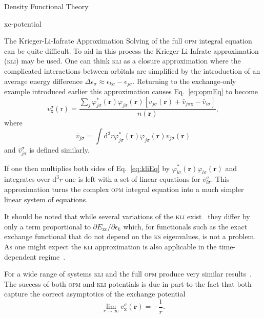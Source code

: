 \documentclass[letterpaper, 11 pt]{report}
\begin{document}
\begin{chapter}{Density Functional Theory \label{chap:dft}}
\begin{section}{xc-potential \label{sec:xcpot}}
\begin{subsection}{The Krieger-Li-Iafrate Approximation \label{sec:kli}}
         Solving of the full \textsc{opm} integral equation can be quite difficult. To aid in this
         process the Krieger-Li-Iafrate approximation~\cite{kli1} (\textsc{kli}) may be used. One can
         think \textsc{kli} as a closure approximation where the complicated interactions between
         orbitals are simplified by the introduction of an average energy difference
         $\Delta \epsilon_\sigma \approx \epsilon_{k \sigma} - \epsilon_{j \sigma}$. Returning to the
         exchange-only example introduced earlier this approximation causes Eq.~\eqref{eq:opmEq} to
         become
         \begin{equation} \label{eq:kliEq}
            v_\mathrm{x}^\sigma(\mathrm{r}) =
               \frac{\sum\limits_{j} \varphi^*_{j \sigma} (\mathbf{r}) \varphi_{j \sigma} (\mathbf{r})
               \left[ v_{j \sigma}(\mathbf{r}) + \bar{v}_{j \sigma \mathrm{x}}
                                               - \bar{v}_{i \sigma} \right]}{n(\mathbf{r})},
         \end{equation}
         where
         \begin{equation}
            \bar{v}_{j \sigma} = \int \mathrm{d}^3 r \varphi^*_{j \sigma} (\mathbf{r})
               \varphi_{j \sigma} (\mathbf{r}) v_{j \sigma} (\mathbf{r})
         \end{equation}
         and $\bar{v}^\sigma_{j \sigma}$ is defined similarly.

         If one then multiplies both sides of Eq.~\eqref{eq:kliEq} by $\varphi^*_{l \sigma} (\mathbf{r})
         \varphi_{l \sigma} (\mathbf{r})$ and integrates over $\mathrm{d}^3 r$ one is left with a set of
         linear equations for $\bar{v}^\sigma_{l \sigma}$. This approximation turns the complex
         \textsc{opm} integral equation into a much simpler linear system of equations.
         
         It should be noted that while several variations of the \textsc{kli} exist~\cite{kli1, kli2,
         kli3} they differ by only a term proportional to $\partial E_\mathrm{xc} / \partial \epsilon_k$
         which, for functionals such as the exact exchange functional that do not depend on the
         \textsc{ks} eigenvalues, is not a problem. As one might expect the \textsc{kli} approximation
         is also applicable in the time-dependent regime~\cite{tdkli1, tdkli2, tdkli3}.
         
         For a wide range of systems \textsc{kli} and the full \textsc{opm} produce very similar
         results~\cite{opm-rev}. The success of both \textsc{opm} and \textsc{kli} potentials is due in
         part to the fact that both capture the correct asymptotics of the exchange potential
         \begin{equation}
            \lim\limits_{r \rightarrow \infty} v_\mathrm{x}^\sigma (\mathbf{r}) = -\frac{1}{r}.
         \end{equation}
 

\end{subsection}
\end{section}
\end{chapter}
\end{document}
